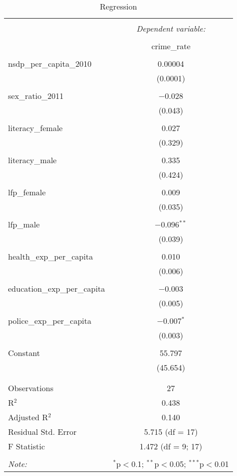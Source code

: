 \documentclass[a4paper]{article}
\begin{document}
\begin{table}[!htbp] \centering 
  \caption{Regression} 
  \label{} 
\begin{tabular}{@{\extracolsep{5pt}}lc} 
\\[-1.8ex]\hline 
\hline \\[-1.8ex] 
 & \multicolumn{1}{c}{\textit{Dependent variable:}} \\ 
\cline{2-2} 
\\[-1.8ex] & crime\_rate \\ 
\hline \\[-1.8ex] 
 nsdp\_per\_capita\_2010 & 0.00004 \\ 
  & (0.0001) \\ 
  & \\ 
 sex\_ratio\_2011 & $-$0.028 \\ 
  & (0.043) \\ 
  & \\ 
 literacy\_female & 0.027 \\ 
  & (0.329) \\ 
  & \\ 
 literacy\_male & 0.335 \\ 
  & (0.424) \\ 
  & \\ 
 lfp\_female & 0.009 \\ 
  & (0.035) \\ 
  & \\ 
 lfp\_male & $-$0.096$^{**}$ \\ 
  & (0.039) \\ 
  & \\ 
 health\_exp\_per\_capita & 0.010 \\ 
  & (0.006) \\ 
  & \\ 
 education\_exp\_per\_capita & $-$0.003 \\ 
  & (0.005) \\ 
  & \\ 
 police\_exp\_per\_capita & $-$0.007$^{*}$ \\ 
  & (0.003) \\ 
  & \\ 
 Constant & 55.797 \\ 
  & (45.654) \\ 
  & \\ 
\hline \\[-1.8ex] 
Observations & 27 \\ 
R$^{2}$ & 0.438 \\ 
Adjusted R$^{2}$ & 0.140 \\ 
Residual Std. Error & 5.715 (df = 17) \\ 
F Statistic & 1.472 (df = 9; 17) \\ 
\hline 
\hline \\[-1.8ex] 
\textit{Note:}  & \multicolumn{1}{r}{$^{*}$p$<$0.1; $^{**}$p$<$0.05; $^{***}$p$<$0.01} \\ 
\end{tabular} 
\end{table} 
 
\end{document}
